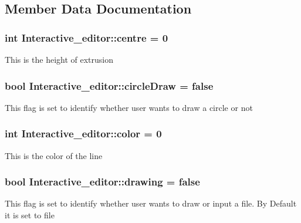 \subsection{Member Data Documentation}
\subsubsection[{\texorpdfstring{centre}{centre}}]{\setlength{\rightskip}{0pt plus 5cm}int Interactive\+\_\+editor\+::centre = 0}\hypertarget{classInteractive__editor_acb67c8393df8fe6f6f938f0609f24050}{}\label{classInteractive__editor_acb67c8393df8fe6f6f938f0609f24050}
This is the height of extrusion 
\subsubsection[{\texorpdfstring{circle\+Draw}{circleDraw}}]{\setlength{\rightskip}{0pt plus 5cm}bool Interactive\+\_\+editor\+::circle\+Draw = false}\hypertarget{classInteractive__editor_a1d7855fd44f17fb78dbb86e8b7962758}{}\label{classInteractive__editor_a1d7855fd44f17fb78dbb86e8b7962758}
This flag is set to identify whether user wants to draw a circle or not 
\subsubsection[{\texorpdfstring{color}{color}}]{\setlength{\rightskip}{0pt plus 5cm}int Interactive\+\_\+editor\+::color = 0}\hypertarget{classInteractive__editor_a8bb78acdc55bebbe34bc545eb720217c}{}\label{classInteractive__editor_a8bb78acdc55bebbe34bc545eb720217c}
This is the color of the line 
\subsubsection[{\texorpdfstring{drawing}{drawing}}]{\setlength{\rightskip}{0pt plus 5cm}bool Interactive\+\_\+editor\+::drawing = false}\hypertarget{classInteractive__editor_ace62b483a0866c64212ee0c641445c7a}{}\label{classInteractive__editor_ace62b483a0866c64212ee0c641445c7a}
This flag is set to identify whether user wants to draw or input a file. By Default it is set to file 
